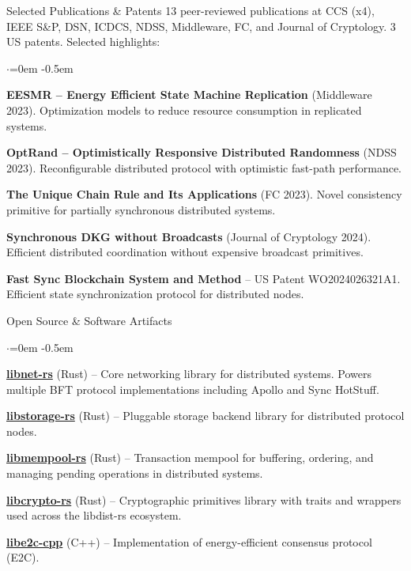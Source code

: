 \documentclass{resume}
\begin{document}
\begin{rSection}{Selected Publications \& Patents}
\label{sec:orgf855de2}
\vspace{0.5em}
13 peer-reviewed publications at CCS (x4), IEEE S\&P, DSN, ICDCS, NDSS, Middleware, FC, and Journal of Cryptology. 3 US patents. Selected highlights:
\begin{list}{$\cdot$}{\leftmargin=0em}
\itemsep -0.5em \vspace{-0.5em}
 \item  \textbf{EESMR -- Energy Efficient State Machine Replication} (Middleware 2023). Optimization models to reduce resource consumption in replicated systems.
 \item  \textbf{OptRand -- Optimistically Responsive Distributed Randomness} (NDSS 2023). Reconfigurable distributed protocol with optimistic fast-path performance.
 \item  \textbf{The Unique Chain Rule and Its Applications} (FC 2023). Novel consistency primitive for partially synchronous distributed systems.
 \item  \textbf{Synchronous DKG without Broadcasts} (Journal of Cryptology 2024). Efficient distributed coordination without expensive broadcast primitives.
 \item  \textbf{Fast Sync Blockchain System and Method} -- US Patent WO2024026321A1. Efficient state synchronization protocol for distributed nodes.
\end{list}
\vspace{0.5em}
\end{rSection}
\begin{rSection}{Open Source \& Software Artifacts}
\label{sec:org55e6bbd}
\vspace{0.5em}
\begin{list}{$\cdot$}{\leftmargin=0em}
\itemsep -0.5em \vspace{-0.5em}
 \item  \textbf{\href{https://github.com/libdist-rs/libnet-rs}{libnet-rs}} (Rust) -- Core networking library for distributed systems. Powers multiple BFT protocol implementations including Apollo and Sync HotStuff.
 \item  \textbf{\href{https://github.com/libdist-rs/libstorage-rs}{libstorage-rs}} (Rust) -- Pluggable storage backend library for distributed protocol nodes.
 \item  \textbf{\href{https://github.com/libdist-rs/libmempool-rs}{libmempool-rs}} (Rust) -- Transaction mempool for buffering, ordering, and managing pending operations in distributed systems.
 \item  \textbf{\href{https://github.com/libdist-rs/libcrypto-rs}{libcrypto-rs}} (Rust) -- Cryptographic primitives library with traits and wrappers used across the libdist-rs ecosystem.
 \item  \textbf{\href{https://github.com/adithyabhatkajake/libe2c-cpp}{libe2c-cpp}} (C++) -- Implementation of energy-efficient consensus protocol (E2C).
\end{list}
\end{rSection}
\end{document}
